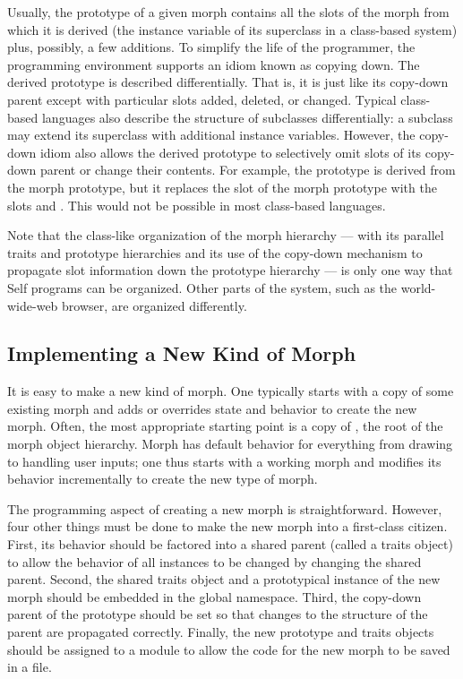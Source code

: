 \documentclass[letterpaper,10pt,english]{sphinxmanual}
\begin{document}
Usually, the prototype of a given morph contains all the slots of the morph from which it is derived (the \sphinxquotedblleft{}instance variable of its superclass\sphinxquotedblright{} in a class-based system) plus, possibly, a few additions. To simplify the life of the programmer, the programming environment supports an idiom known as \sphinxquotedblleft{}copying down.\sphinxquotedblright{} The derived prototype is described differentially. That is, it is \sphinxquotedblleft{}just like its copy-down parent except with particular slots added, deleted, or changed.\sphinxquotedblright{} Typical class-based languages also describe the structure of subclasses differentially: a subclass may extend its superclass with additional instance variables. However, the copy-down idiom also allows the derived prototype to selectively omit slots of its copy-down parent or change their contents. For example, the  prototype is derived from the morph prototype, but it replaces the \sphinxquotedblleft{}\sphinxquotedblright{} slot of the morph prototype with the slots \sphinxquotedblleft{}\sphinxquotedblright{} and \sphinxquotedblleft{}\sphinxquotedblright{}. This would not be possible in most class-based languages.

Note that the class-like organization of the morph hierarchy — with its parallel traits and prototype hierarchies and its use of the copy-down mechanism to propagate slot information down the prototype hierarchy — is only one way that Self programs can be organized. Other parts of the system, such as the world-wide-web browser, are organized differently.


\subsection{Implementing a New Kind of Morph}
\label{\detokenize{morphic:implementing-a-new-kind-of-morph}}
It is easy to make a new kind of morph. One typically starts with a copy of some existing morph and adds or overrides state and behavior to create the new morph. Often, the most appropriate starting point is a copy of , the root of the morph object hierarchy. Morph has default behavior for everything from drawing to handling user inputs; one thus starts with a working morph and modifies its behavior incrementally to create the new type of morph.

The programming aspect of creating a new morph is straightforward. However, four other things must be done to make the new morph into a first-class citizen. First, its behavior should be factored into a shared parent (called a traits object) to allow the behavior of all instances to be changed by changing the shared parent. Second, the shared traits object and a prototypical instance of the new morph should be embedded in the global namespace. Third, the copy-down parent of the prototype should be set so that changes to the structure of the parent are propagated correctly. Finally, the new prototype and traits objects should be assigned to a module to allow the code for the new morph to be saved in a file.
\end{document}
